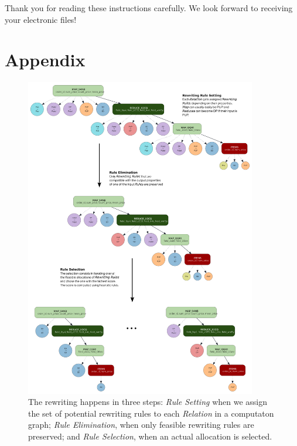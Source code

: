 \documentclass[letterpaper]{article} %
\begin{document}
\bigskip
\noindent Thank you for reading these instructions carefully. We look forward to receiving your electronic files!

% 

\appendix

\section*{Appendix}

\begin{figure}[t]
    \centering
    \includegraphics[width=0.9\textwidth]{figures/set_eliminate_select} %
    \caption{The rewriting happens in three steps: \emph{Rule Setting} when we assign the set of potential rewriting rules to each \emph{Relation} in a computaton graph; \emph{Rule Elimination}, when only feasible rewriting rules are preserved; and \emph{Rule Selection}, when an actual allocation is selected.}
    \label{fig:set_eliminate_select}
\end{figure}
\end{document}
